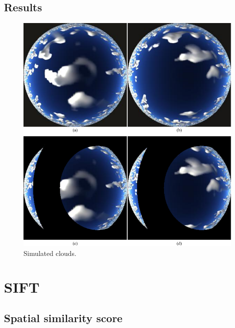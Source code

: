 \documentclass[runningheads]{llncs}
\begin{document}
\subsection{Results}

\begin{figure}
  \begin{center}
    \includegraphics{figures/simulation_imgs}
    \caption{Simulated clouds.}
    \label{fig:simulation_imgs}
  \end{center}
\end{figure}


\section{SIFT}

\subsection*{Spatial similarity score}
\label{sec:appearancecore}
\end{document}
